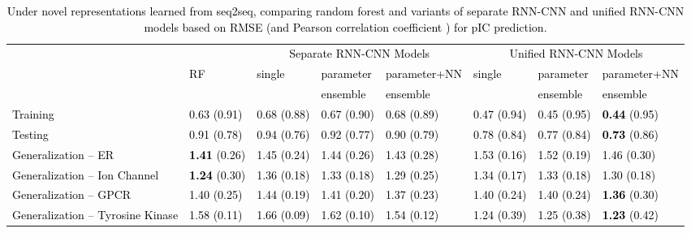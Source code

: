 \documentclass[nocrop]{bioinfo}
\newcommand{\red}[1]{\textcolor{black}{#1}}
\begin{document}
\begin{table*}[!htb]
\centering
{
\red{
\begin{tabular}{l|l|lll|lll}
\toprule
&  & \multicolumn{3}{c|}{Separate RNN-CNN Models}  &\multicolumn{3}{c}{Unified RNN-CNN Models}\\ \cline{3-8}
&  RF  & single & parameter &parameter+NN & single & parameter  & parameter+NN\\
    &   &  & ensemble&ensemble&  & ensemble  & ensemble\\
  \hline
 Training & 0.63 (0.91) & 0.68 (0.88)&0.67 (0.90)&0.68 (0.89)&0.47 (0.94)&0.45 (0.95)&\textbf{0.44} (0.95)\\
 \hline
 Testing & 0.91 (0.78) & 0.94 (0.76) & 0.92 (0.77)&0.90 (0.79)&0.78 (0.84)&0.77 (0.84)&\textbf{0.73} (0.86)\\
   \hline
 Generalization -- ER & \textbf{1.41} (0.26)& 1.45 (0.24) & 1.44 (0.26)&1.43 (0.28)&1.53 (0.16)&1.52 (0.19)&1.46 (0.30)\\
 \hline
 Generalization -- Ion Channel & \textbf{1.24} (0.30)& 1.36 (0.18) &1.33 (0.18)&1.29 (0.25)&1.34 (0.17)&1.33 (0.18)&1.30 (0.18)\\
   \hline
 Generalization -- GPCR &  1.40 (0.25)& 1.44 (0.19)&1.41 (0.20)&1.37 (0.23)&1.40 (0.24)&1.40 (0.24)&\textbf{1.36} (0.30)\\
    \hline
 Generalization -- Tyrosine Kinase &  1.58 (0.11) & 1.66 (0.09)&1.62 (0.10)&1.54 (0.12)&1.24 (0.39)&1.25 (0.38)&\textbf{1.23} (0.42)\\
 \hline
\end{tabular}
}
}
\caption{Under novel representations learned from seq2seq, comparing random forest and variants of separate RNN-CNN and unified RNN-CNN models based on RMSE  (and Pearson correlation \red{coefficient }) for pIC prediction.}
\label{table:genaral_acc}
\end{table*}
\vspace{-1em}
\end{document}
